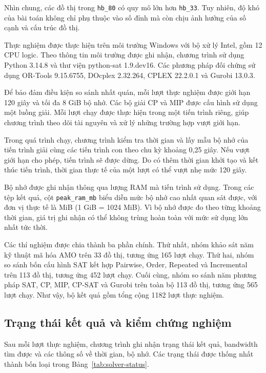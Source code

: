 \documentclass[a4paper,fleqn]{cas-sc}
\newcommand{\code}[1]{\nolinkurl{#1}}
\begin{document}
Nhìn chung, các đồ thị trong \code{hb_80} có quy mô lớn hơn \code{hb_33}. Tuy nhiên, độ khó của bài toán không chỉ phụ thuộc vào số đỉnh mà còn chịu ảnh hưởng của số cạnh và cấu trúc đồ thị.

Thực nghiệm được thực hiện trên môi trường Windows với bộ xử lý Intel, gồm 12 CPU logic. Theo thông tin môi trường được ghi nhận, chương trình sử dụng Python 3.14.8 và thư viện python-sat 1.9.dev16. Các phương pháp đối chứng sử dụng OR-Tools 9.15.6755, DOcplex 2.32.264, CPLEX 22.2.0.1 và Gurobi 13.0.3.

Để bảo đảm điều kiện so sánh nhất quán, mỗi lượt thực nghiệm được giới hạn 120 giây và tối đa 8 GiB bộ nhớ. Các bộ giải CP và MIP được cấu hình sử dụng một luồng giải. Mỗi lượt chạy được thực hiện trong một tiến trình riêng, giúp chương trình theo dõi tài nguyên và xử lý những trường hợp vượt giới hạn.

Trong quá trình chạy, chương trình kiểm tra thời gian và lấy mẫu bộ nhớ của tiến trình giải cùng các tiến trình con theo chu kỳ khoảng 0,25 giây. Nếu vượt giới hạn cho phép, tiến trình sẽ được dừng. Do có thêm thời gian khởi tạo và kết thúc tiến trình, thời gian thực tế của một lượt có thể vượt nhẹ mức 120 giây.

Bộ nhớ được ghi nhận thông qua lượng RAM mà tiến trình sử dụng. Trong các tệp kết quả, cột \code{peak_ram_mb} biểu diễn mức bộ nhớ cao nhất quan sát được, với đơn vị thực tế là MiB (1 GiB = 1024 MiB). Vì bộ nhớ được đo theo từng khoảng thời gian, giá trị ghi nhận có thể không trùng hoàn toàn với mức sử dụng lớn nhất tức thời.

Các thí nghiệm được chia thành ba phần chính. Thứ nhất, nhóm khảo sát năm kỹ thuật mã hóa AMO trên 33 đồ thị, tương ứng 165 lượt chạy. Thứ hai, nhóm so sánh bốn cấu hình SAT kết hợp Pairwise, Order, Repeated và Incremental trên 113 đồ thị, tương ứng 452 lượt chạy. Cuối cùng, nhóm so sánh năm phương pháp SAT, CP, MIP, CP-SAT và Gurobi trên toàn bộ 113 đồ thị, tương ứng 565 lượt chạy. Như vậy, bộ kết quả gồm tổng cộng 1182 lượt thực nghiệm.

\subsection{Trạng thái kết quả và kiểm chứng nghiệm}

Sau mỗi lượt thực nghiệm, chương trình ghi nhận trạng thái kết quả, bandwidth tìm được và các thông số về thời gian, bộ nhớ. Các trạng thái được thống nhất thành bốn loại trong Bảng~\ref{tab:solver-status}.
\end{document}
